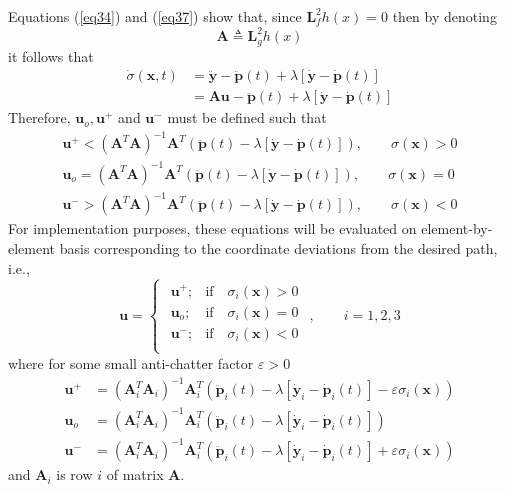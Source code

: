 \documentclass[twocolumn,10pt]{asme2e}
\begin{document}
{Equations (\ref{eq34}) and (\ref{eq37}) show that, since $\textbf{L}_f^2h(x)=0$ then by denoting
\begin{equation}\textbf{A}\triangleq\textbf{L}_{g}^2h(x)\end{equation} it follows that
\begin{align}\dot{\sigma}(\textbf{x},t)&=\ddot{\textbf{y}}-\ddot{\textbf{p}}(t)+\lambda\left[\dot{\textbf{y}}-\dot{\textbf{p}}(t)\right]\\
&=\textbf{A}\textbf{u}-\ddot{\textbf{p}}(t)+\lambda\left[\dot{\textbf{y}}-\dot{\textbf{p}}(t)\right]\end{align}
Therefore, $\textbf{u}_o, \textbf{u}^{+}$ and $\textbf{u}^{-}$ must be defined such that
\begin{align}
	\textbf{u}^{+}<\left(\textbf{A}^T\textbf{A}\right)^{-1}\textbf{A}^T\left(\ddot{\textbf{p}}(t)-\lambda\left[\dot{\textbf{y}}-\dot{\textbf{p}}(t)\right]\right), \qquad \sigma(\textbf{x})>0\\
	\textbf{u}_o=\left(\textbf{A}^T\textbf{A}\right)^{-1}\textbf{A}^T\left(\ddot{\textbf{p}}(t)-\lambda\left[\dot{\textbf{y}}-\dot{\textbf{p}}(t)\right]\right), \qquad \sigma(\textbf{x})=0\\
	\textbf{u}^{-}>\left(\textbf{A}^T\textbf{A}\right)^{-1}\textbf{A}^T\left(\ddot{\textbf{p}}(t)-\lambda\left[\dot{\textbf{y}}-\dot{\textbf{p}}(t)\right]\right),\qquad \sigma(\textbf{x})<0 \label{eq46}
\end{align}
For implementation purposes, these equations will be evaluated on element-by-element basis corresponding to the coordinate deviations from the desired path, i.e., \begin{equation}
	\textbf{u}=\begin{cases}
		\begin{array}{lr}
			\textbf{u}^{+}; &  \text{if}\quad \sigma_i(\textbf{x})>0\\  
			\textbf{u}_o; &  \text{if}\quad \sigma_i(\textbf{x})=0\\ 
			\textbf{u}^{-}; &  \text{if}\quad \sigma_i(\textbf{x})<0\\
		\end{array}
	\end{cases},\qquad i=1,2,3
\end{equation}
where for some small anti-chatter factor $\varepsilon>0$
\begin{align}
	\textbf{u}^{+}&=\left(\textbf{A}_i^T\textbf{A}_i\right)^{-1}\textbf{A}_i^T\left(\ddot{\textbf{p}}_i(t)-\lambda\left[\dot{\textbf{y}}_i-\dot{\textbf{p}}_i(t)\right]-\varepsilon\sigma_i(\textbf{x})\right)\\
	\textbf{u}_o&=\left(\textbf{A}_i^T\textbf{A}_i\right)^{-1}\textbf{A}_i^T\left(\ddot{\textbf{p}}_i(t)-\lambda\left[\dot{\textbf{y}}_i-\dot{\textbf{p}}_i(t)\right]\right)\\
	\textbf{u}^{-}&=\left(\textbf{A}_i^T\textbf{A}_i\right)^{-1}\textbf{A}_i^T\left(\ddot{\textbf{p}}_i(t)-\lambda\left[\dot{\textbf{y}}_i-\dot{\textbf{p}}_i(t)\right]+\varepsilon\sigma_i(\textbf{x})\right) \label{eq46}
\end{align}
and $\textbf{A}_i$ is row $i$ of matrix $\textbf{A}$.

}
\end{document}
